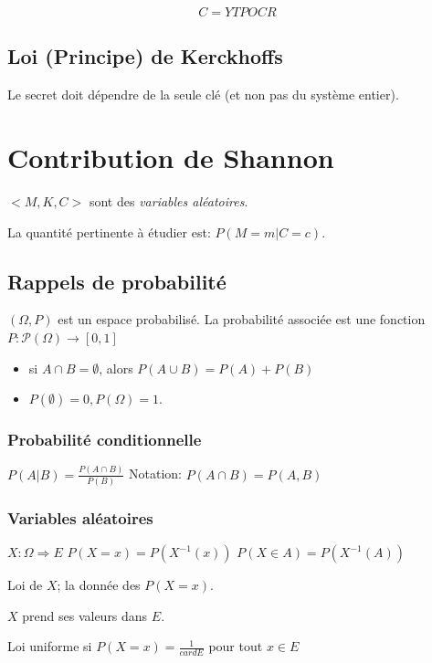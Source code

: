 \documentclass[12pt,a4paper]{article}
\begin{document}
\begin{displaymath}
C = YTPOCR
\end{displaymath}

\subsection{Loi (Principe) de Kerckhoffs}
Le secret doit dépendre de la seule clé (et non pas du système entier).


\section{Contribution de Shannon}

$< M,K,C >$ sont des {\em variables aléatoires}.

\medskip

La quantité pertinente à étudier est: $P(M=m | C=c)$.

\subsection{Rappels de probabilité}

$(\Omega ,P)$ est un espace probabilisé. La probabilité associée est une
fonction $P:\mathcal{P}(\Omega) \to [0,1]$\\

\begin{itemize}
\item si $ A \cap B = \emptyset$, alors $P(A \cup B) = P(A) + P(B)$ 
\item $ P(\emptyset)=0, P(\Omega)=1$.
\end{itemize}

\subsubsection{Probabilité conditionnelle}

$ P(A | B)=\frac{P(A\cap B)}{P(B)}$
Notation: $P(A \cap B) = P(A,B)$
\subsubsection{Variables aléatoires}

$X: \Omega \Rightarrow E $
$ P(X=x) = P(X^{-1}(x)) $ 
$ P(X \in A)= P(X^{-1} (A))$

Loi de $X$; la donnée des $P(X=x)$.

$X$ prend ses valeurs dans $E$.

Loi uniforme si $P(X=x)=\frac{1}{card E}$ pour tout $x\in E$
\end{document}
